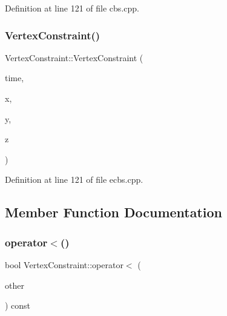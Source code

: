 Definition at line 121 of file cbs.\+cpp.

\mbox{\label{struct_vertex_constraint_a9916de476d15970c6be19739d89b8ff3}} 
\subsubsection{\texorpdfstring{Vertex\+Constraint()}{VertexConstraint()}\hspace{0.1cm}{\footnotesize\ttfamily [2/2]}}
{\footnotesize\ttfamily Vertex\+Constraint\+::\+Vertex\+Constraint (\begin{DoxyParamCaption}\item[{int}]{time,  }\item[{int}]{x,  }\item[{int}]{y,  }\item[{int}]{z }\end{DoxyParamCaption})\hspace{0.3cm}{\ttfamily [inline]}}



Definition at line 121 of file ecbs.\+cpp.



\subsection{Member Function Documentation}
\mbox{\label{struct_vertex_constraint_a7c3dc8c528e5047776be956697979552}} 
\subsubsection{\texorpdfstring{operator$<$()}{operator<()}\hspace{0.1cm}{\footnotesize\ttfamily [1/2]}}
{\footnotesize\ttfamily bool Vertex\+Constraint\+::operator$<$ (\begin{DoxyParamCaption}\item[{const \hyperlink{struct_vertex_constraint}{Vertex\+Constraint} \&}]{other }\end{DoxyParamCaption}) const\hspace{0.3cm}{\ttfamily [inline]}}



